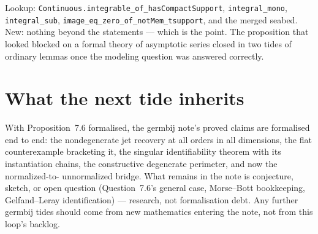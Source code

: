 \documentclass[11pt]{article}
\newcommand{\code}[1]{\texttt{#1}}
\begin{document}
Lookup: \code{Continuous.integrable\_of\_hasCompactSupport},
\code{integral\_mono}, \code{integral\_sub},
\code{image\_eq\_zero\_of\_notMem\_tsupport}, and the merged seabed.
New: nothing beyond the statements --- which is the point. The
proposition that looked blocked on a formal theory of asymptotic
series closed in two tides of ordinary lemmas once the modeling
question was answered correctly.

\section{What the next tide inherits}

With Proposition~7.6 formalised, the germbij note's proved claims
are formalised end to end: the nondegenerate jet recovery at all
orders in all dimensions, the flat counterexample bracketing it, the
singular identifiability theorem with its instantiation chains, the
constructive degenerate perimeter, and now the normalized-to-
unnormalized bridge. What remains in the note is conjecture,
sketch, or open question (Question~7.6's general case, Morse--Bott
bookkeeping, Gelfand--Leray identification) --- research, not
formalisation debt. Any further germbij tides should come from new
mathematics entering the note, not from this loop's backlog.
\end{document}
